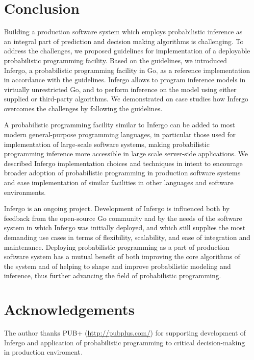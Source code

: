 \documentclass[sigplan,10pt,screen]{acmart}
\begin{document}
\begin{sloppypar}
\section{Conclusion}

Building a production software system which employs
probabilistic inference as an integral part of prediction and
decision making algorithms is challenging. To address the
challenges, we proposed guidelines for implementation of a
deployable probabilistic programming facility. Based on the
guidelines, we introduced Infergo, a probabilistic programming
facility in Go, as a reference implementation in accordance with
the guidelines.  Infergo allows to program inference models in
virtually unrestricted Go, and to perform inference on the model
using either supplied or third-party algorithms. We demonstrated
on case studies how Infergo overcomes the challenges by
following the guidelines.

A probabilistic programming facility similar to Infergo can be
added to most modern general-purpose programming languages, in
particular those used for implementation of large-scale software
systems, making probabilistic programming inference more
accessible in large scale server-side applications. We described
Infergo implementation choices and techniques in intent
to encourage broader adoption of probabilistic programming in
production software systems and ease implementation of similar
facilities in other languages and software environments.

Infergo is an ongoing project. Development of Infergo is
influenced both by feedback from the open-source Go community
and by the needs of the software system in which Infergo was
initially deployed, and which still supplies the most demanding
use cases in terms of flexibility, scalability, and ease of
integration and maintenance. Deploying probabilistic programming
as a part of production software system has a mutual benefit of
both improving the core algorithms of the system and of helping
to shape and improve probabilistic modeling and inference, thus
further advancing the field of probabilistic programming.

\end{sloppypar}

\section*{Acknowledgements}

The author thanks PUB+ (\url{http://pubplus.com/}) for
supporting development of Infergo and application of
probabilistic programming to critical decision-making in
production enviroment.
\end{document}
